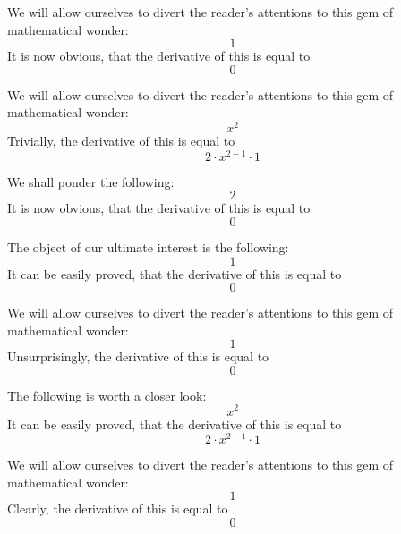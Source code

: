 \documentclass{article}
\begin{document}
We will allow ourselves to divert the reader's attentions to this gem of mathematical wonder:
\begin{equation}
1 
\end{equation}
It is now obvious, that the derivative of this is equal to
\begin{equation}
0 
\end{equation}

We will allow ourselves to divert the reader's attentions to this gem of mathematical wonder:
\begin{equation}
x ^{2 } 
\end{equation}
Trivially, the derivative of this is equal to
\begin{equation}
2 \cdot x ^{2 - 1 } \cdot 1 
\end{equation}

We shall ponder the following:
\begin{equation}
2 
\end{equation}
It is now obvious, that the derivative of this is equal to
\begin{equation}
0 
\end{equation}

The object of our ultimate interest is the following:
\begin{equation}
1 
\end{equation}
It can be easily proved, that the derivative of this is equal to
\begin{equation}
0 
\end{equation}

We will allow ourselves to divert the reader's attentions to this gem of mathematical wonder:
\begin{equation}
1 
\end{equation}
Unsurprisingly, the derivative of this is equal to
\begin{equation}
0 
\end{equation}

The following is worth a closer look:
\begin{equation}
x ^{2 } 
\end{equation}
It can be easily proved, that the derivative of this is equal to
\begin{equation}
2 \cdot x ^{2 - 1 } \cdot 1 
\end{equation}

We will allow ourselves to divert the reader's attentions to this gem of mathematical wonder:
\begin{equation}
1 
\end{equation}
Clearly, the derivative of this is equal to
\begin{equation}
0 
\end{equation}
\end{document}

